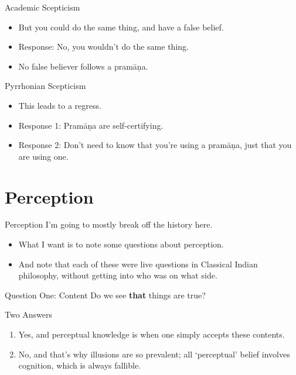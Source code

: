 \documentclass[
  17pt,
  letterpaper,
  ignorenonframetext,
  aspectratio=169,
  handout]{beamer}
\providecommand{\tightlist}{%
  \setlength{\itemsep}{0pt}\setlength{\parskip}{0pt}}\usepackage{longtable,booktabs,array}
\begin{document}
\begin{frame}{Academic Scepticism}
\protect\hypertarget{academic-scepticism}{}
\begin{itemize}[<+->]
\tightlist
\item
  But you could do the same thing, and have a false belief.
\item
  Response: No, you wouldn't do the same thing.
\item
  No false believer follows a pramāṇa.
\end{itemize}
\end{frame}

\begin{frame}{Pyrrhonian Scepticism}
\protect\hypertarget{pyrrhonian-scepticism}{}
\begin{itemize}[<+->]
\tightlist
\item
  This leads to a regress.
\item
  Response 1: Pramāṇa are self-certifying.
\item
  Response 2: Don't need to know that you're using a pramāṇa, just that
  you are using one.
\end{itemize}
\end{frame}

\hypertarget{perception}{%
\section{Perception}\label{perception}}

\begin{frame}{Perception}
\protect\hypertarget{perception-1}{}
I'm going to mostly break off the history here.

\begin{itemize}[<+->]
\tightlist
\item
  What I want is to note some questions about perception.
\item
  And note that each of these were live questions in Classical Indian
  philosophy, without getting into who was on what side.
\end{itemize}
\end{frame}

\begin{frame}{Question One: Content}
\protect\hypertarget{question-one-content}{}
Do we see \textbf{that} things are true?
\end{frame}

\begin{frame}{Two Answers}
\protect\hypertarget{two-answers}{}
\begin{enumerate}[<+->]
\tightlist
\item
  Yes, and perceptual knowledge is when one simply accepts these
  contents.
\item
  No, and that's why illusions are so prevalent; all `perceptual' belief
  involves cognition, which is always fallible.
\end{enumerate}
\end{frame}
\end{document}
